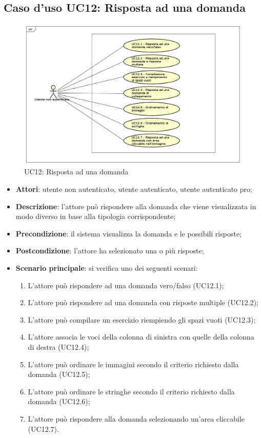 \newpage
\subsection{Caso d'uso UC12: Risposta ad una domanda}
\label{UC12}
\begin{figure}[h]
	\centering
	\includegraphics[scale=0.5]{UML/UC12.png}
	\caption{UC12: Risposta ad una domanda}
\end{figure}

\begin{itemize}
\item \textbf{Attori}: utente non autenticato, utente autenticato, utente autenticato pro;
\item \textbf{Descrizione}: l'attore può rispondere alla domanda che viene visualizzata in modo diverso in base alla tipologia corrispondente;
\item \textbf{Precondizione}: il sistema visualizza la domanda e le possibili risposte;
\item \textbf{Postcondizione}: l'attore ha selezionato una o più risposte;
\item \textbf{Scenario principale}: si verifica uno dei seguenti scenari:
\begin{enumerate}
	\item L'attore può rispondere ad una domanda vero/falso (UC12.1);
	\item L'attore può rispondere ad una domanda con risposte multiple (UC12.2);
	\item L'attore può compilare un esercizio riempiendo gli spazi vuoti (UC12.3);
	\item L'attore associa le voci della colonna di sinistra con quelle della colonna di destra (UC12.4);
	\item L'attore può ordinare le immagini secondo il criterio richiesto dalla domanda (UC12.5);
	\item L'attore può ordinare le stringhe secondo il criterio richiesto dalla domanda (UC12.6);
	\item L'attore può rispondere alla domanda selezionando un'area cliccabile (UC12.7). 
\end{enumerate}
\end{itemize}

